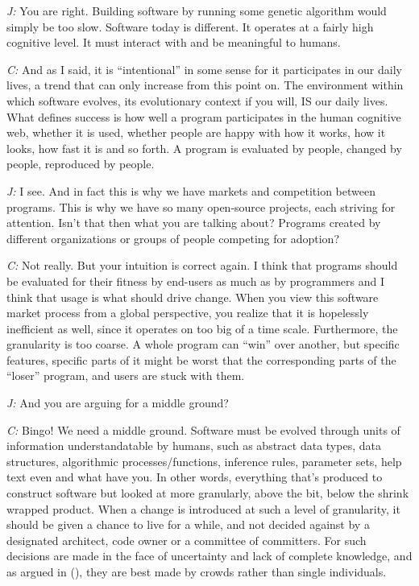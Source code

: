 \documentclass[10pt]{sigplanconf}
\begin{document}
\emph{J:} You are right. Building software by running some genetic algorithm would simply be too slow. Software today is different. It operates at a fairly high cognitive level. It must interact with and be meaningful to humans.

\emph{C:} And as I said, it is ``intentional'' in some sense for it participates in our daily lives, a trend that can only increase from this point on. The environment within which software evolves, its evolutionary context if you will, IS our daily lives. What defines success is how well a program participates in the human cognitive web, whether it is used, whether people are happy with how it works, how it looks, how fast it is and so forth. A program is evaluated by people, changed by people, reproduced by people.

\emph{J:} I see. And in fact this is why we have markets and competition between programs. This is why we have so many open-source projects, each striving for attention. Isn't that then what you are talking about? Programs created by different organizations or groups of people competing for adoption?

\emph{C:} Not really. But your intuition is correct again. I think that programs should be evaluated for their fitness by end-users as much as by programmers and I think that usage is what should drive change. When you view this software market process from a global perspective, you realize that it is hopelessly inefficient as well, since it operates on too big of a time scale. Furthermore, the granularity is too coarse. A whole program can ``win'' over another, but specific features, specific parts of it might be worst that the corresponding parts of the ``loser'' program, and users are stuck with them.

\emph{J:} And you are arguing for a middle ground?

\emph{C:} Bingo! We need a middle ground. Software must be evolved through units of information understandatable by humans, such as abstract data types, data structures, algorithmic processes/functions, inference rules, parameter sets, help text even and what have you. In other words, everything that's produced to construct software but looked at more granularly, above the bit, below the shrink wrapped product. When a change is introduced at such a level of granularity, it should be given a chance to live for a while, and not decided against by a designated architect, code owner or a committee of committers. For such decisions are made in the face of uncertainty and lack of complete knowledge, and as argued in (\cite{surowiecki}), they are best made by crowds rather than single individuals.
\end{document}
